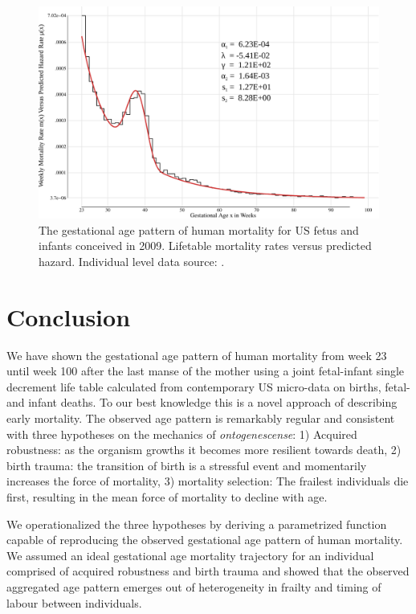 \documentclass[12pt, parskip=half]{scrartcl}
\begin{document}
\begin{figure}[!htb]
  \centering
  \includegraphics[width = \textwidth]{./fig/us_fimort_2009_mx_predobs.pdf}
  \caption{The gestational age pattern of human mortality for US fetus and infants conceived in 2009. Lifetable mortality rates versus predicted hazard. Individual level data source: \cite{DVS2015}.}
  \label{fig:us_fimort_2009_mx_predobs}
\end{figure}

\section{Conclusion} %
\label{sec:conclusion}

We have shown the gestational age pattern of human mortality from week 23 until week 100 after the last manse of the mother using a joint fetal-infant single decrement life table calculated from contemporary US micro-data on births, fetal- and infant deaths. To our best knowledge this is a novel approach of describing early mortality. The observed age pattern is remarkably regular and consistent with three hypotheses on the mechanics of \emph{ontogenescense}: 1) Acquired robustness: as the organism growths it becomes more resilient towards death, 2) birth trauma: the transition of birth is a stressful event and momentarily increases the force of mortality, 3) mortality selection: The frailest individuals die first, resulting in the mean force of mortality to decline with age.

We operationalized the three hypotheses by deriving a parametrized function capable of reproducing the observed gestational age pattern of human mortality. We assumed an ideal gestational age mortality trajectory for an individual comprised of acquired robustness and birth trauma and showed that the observed aggregated age pattern emerges out of heterogeneity in frailty and timing of labour between individuals.
\end{document}
